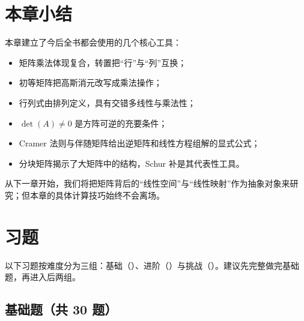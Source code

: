 \section*{本章小结}

本章建立了今后全书都会使用的几个核心工具：
\begin{itemize}
  \item 矩阵乘法体现复合，转置把“行”与“列”互换；
  \item 初等矩阵把高斯消元改写成乘法操作；
  \item 行列式由排列定义，具有交错多线性与乘法性；
  \item $\det(A)\ne0$ 是方阵可逆的充要条件；
  \item Cramer 法则与伴随矩阵给出逆矩阵和线性方程组解的显式公式；
  \item 分块矩阵揭示了大矩阵中的结构，Schur 补是其代表性工具。
\end{itemize}

从下一章开始，我们将把矩阵背后的“线性空间”与“线性映射”作为抽象对象来研究；但本章的具体计算技巧始终不会离场。

\section*{习题}

以下习题按难度分为三组：基础（\basic）、进阶（\medium）与挑战（\hard）。建议先完整做完基础题，再进入后两组。

\subsection*{基础题（共 30 题）}

